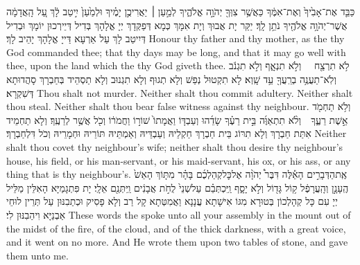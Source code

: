 {כַּבֵּ֤ד אֶת־אָבִ֙יךָ֙ וְאֶת־אִמֶּ֔ךָ כַּאֲשֶׁ֥ר צִוְּךָ֖ יְהֹוָ֣ה אֱלֹהֶ֑יךָ לְמַ֣עַן ׀ יַאֲרִיכֻ֣ן יָמֶ֗יךָ וּלְמַ֙עַן֙ יִ֣יטַב לָ֔ךְ עַ֚ל הָֽאֲדָמָ֔ה אֲשֶׁר־יְהֹוָ֥ה אֱלֹהֶ֖יךָ נֹתֵ֥ן לָֽךְ׃\setuma}
{יַקַּר יָת אֲבוּךְ וְיָת אִמָּךְ כְּמָא דְּפַקְּדָךְ יְיָ אֱלָהָךְ בְּדִיל דְּיֵירְכוּן יוֹמָךְ וּבְדִיל דְּיִיטַב לָךְ עַל אַרְעָא דַּייָ אֱלָהָךְ יָהֵיב לָךְ׃}
{Honour thy father and thy mother, as the \lord\space thy God commanded thee; that thy days may be long, and that it may go well with thee, upon the land which the \lord\space thy God giveth thee.}{}
{לֹ֥א תִרְצַ֖ח \setuma וְלֹ֣א תִנְאָ֑ף \setuma וְלֹ֣א תִגְנֹ֔ב \setuma וְלֹֽא־תַעֲנֶ֥ה בְרֵֽעֲךָ֖ עֵ֥ד שָֽׁוְא׃\setuma}
{לָא תִקְטוּל נְפַשׁ וְלָא תְגוּף וְלָא תִגְנוּב וְלָא תַסְהֵיד בְּחַבְרָךְ סָהֲדוּתָא דְּשִׁקְרָא׃}
{Thou shalt not murder. Neither shalt thou commit adultery. Neither shalt thou steal. Neither shalt thou bear false witness against thy neighbour.}{}
{וְלֹ֥א תַחְמֹ֖ד אֵ֣שֶׁת רֵעֶ֑ךָ וְלֹ֨א תִתְאַוֶּ֜ה בֵּ֣ית רֵעֶ֗ךָ שָׂדֵ֜הוּ וְעַבְדּ֤וֹ וַאֲמָתוֹ֙ שׁוֹר֣וֹ וַחֲמֹר֔וֹ וְכֹ֖ל אֲשֶׁ֥ר לְרֵעֶֽךָ׃\setuma}
{וְלָא תַחְמֵיד אִתַּת חַבְרָךְ וְלָא תִרּוֹג בֵּית חַבְרָךְ חַקְלֵיהּ וְעַבְדֵּיהּ וְאַמְתֵּיהּ תּוֹרֵיהּ וּחְמָרֵיהּ וְכֹל דִּלְחַבְרָךְ׃}
{Neither shalt thou covet thy neighbour’s wife; neither shalt thou desire thy neighbour’s house, his field, or his man-servant, or his maid-servant, his ox, or his ass, or any thing that is thy neighbour’s.}{}
{אֶֽת\maqqaf הַדְּבָרִ֣ים הָאֵ֡לֶּה דִּבֶּר֩ יְהֹוָ֨ה אֶל\maqqaf כׇּל\maqqaf קְהַלְכֶ֜ם בָּהָ֗ר מִתּ֤וֹךְ הָאֵשׁ֙ הֶֽעָנָ֣ן וְהָֽעֲרָפֶ֔ל ק֥וֹל גָּד֖וֹל וְלֹ֣א יָסָ֑ף וַֽיִּכְתְּבֵ֗ם עַל\maqqaf שְׁנֵי֙ לֻחֹ֣ת אֲבָנִ֔ים וַֽיִּתְּנֵ֖ם אֵלָֽי׃}
{יָת פִּתְגָמַיָּא הָאִלֵּין מַלֵּיל יְיָ עִם כָּל קְהָלְכוֹן בְּטוּרָא מִגּוֹ אִישָׁתָא עֲנָנָא וַאֲמִטְּתָא קָל רַב וְלָא פָסִיק וּכְתַבִנּוּן עַל תְּרֵין לוּחֵי אַבְנַיָּא וִיהַבִנּוּן לִי׃}
{These words the \lord\space spoke unto all your assembly in the mount out of the midst of the fire, of the cloud, and of the thick darkness, with a great voice, and it went on no more. And He wrote them upon two tables of stone, and gave them unto me.}{}
